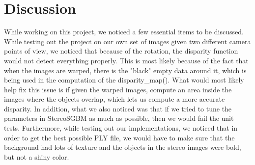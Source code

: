 \documentclass[10pt]{article}
\begin{document}
\section{Discussion}
\label{discussion}
\sf While working on this project, we noticed a few essential items to be discussed. While testing out the project on our own set of images given two different camera points of view, we noticed that because of the rotation, the disparity function would not detect everything properly. This is most likely because of the fact that when the images are warped, there is the "black" empty data around it, which is being used in the computation of the disparity\_map(). What would most likely help fix this issue is if given the warped images, compute an area inside the images where the objects overlap, which lets us compute a more accurate disparity. In addition, what we also noticed was that if we tried to tune the parameters in StereoSGBM as much as possible, then we would fail the unit tests. Furthermore, while testing out our implementations, we noticed that in order to get the best possible PLY file, we would have to make sure that the background had lots of texture and the objects in the stereo images were bold, but not a shiny color.
\end{document}
